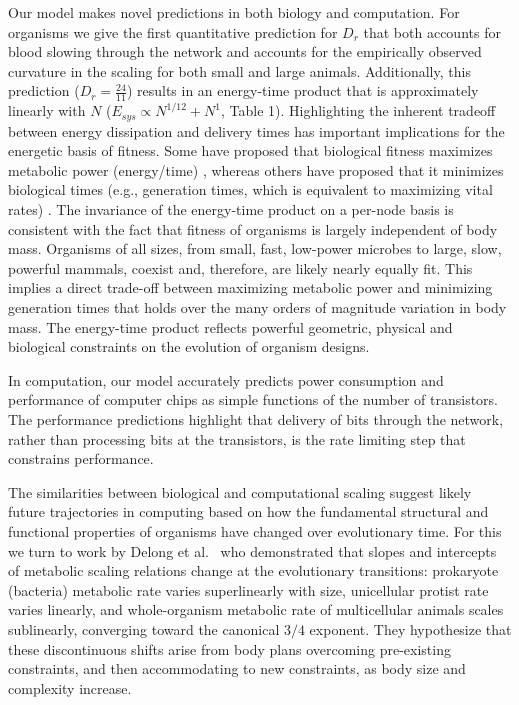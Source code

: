 \documentclass[12pt]{article}
\begin{document}
Our model makes novel predictions in both biology and computation. For organisms we give the first quantitative prediction for $D_r$ that both accounts for blood slowing through the network and accounts for the empirically observed curvature in the scaling for both small and large animals. Additionally, 
this prediction ($D_r = \frac{24}{11}$) results in an energy-time product that is approximately linearly with $N$ ($E_{sys} \propto N^{1/12} + N^1$, Table 1). Highlighting the inherent tradeoff between energy dissipation and delivery times 
has important implications for the energetic basis of fitness.  Some have proposed that biological fitness
maximizes metabolic power (energy/time) \cite{lotka56, odum71}, whereas others
have proposed that it minimizes biological times (e.g., generation times, which
is equivalent to maximizing vital rates) \cite{lindstedt81, sibly91}. The
invariance of the energy-time product on a per-node basis is consistent with the fact that fitness
of organisms is largely independent of body mass.  Organisms of all sizes, from
small, fast, low-power microbes to large, slow, powerful mammals, coexist and,
therefore, are likely nearly equally fit.  This implies a direct trade-off
between maximizing metabolic power and minimizing generation times that holds
over the many orders of magnitude variation in body mass.  The energy-time
product reflects powerful geometric, physical and biological constraints on the
evolution of organism designs.

In computation, our model accurately predicts power consumption and performance of computer chips as simple functions of the number of transistors. The performance predictions highlight that delivery of bits through the network, rather than processing bits at the transistors, is the rate limiting step that constrains performance. 

The similarities between biological and computational scaling
suggest likely future trajectories in computing based on how the fundamental structural and functional properties of organisms have changed over evolutionary time. For this we turn to work by Delong et al.~\cite{delong2010shifts} who
demonstrated that slopes and intercepts of metabolic scaling relations change at the
evolutionary transitions: prokaryote (bacteria) metabolic rate varies superlinearly with
size, unicellular protist rate varies linearly, and whole-organism metabolic rate of multicellular animals scales sublinearly, converging toward the canonical $3/4$ exponent. They
hypothesize that these discontinuous shifts arise from body plans overcoming pre-existing
constraints, and then accommodating to new constraints, as body size and complexity increase.
\end{document}
